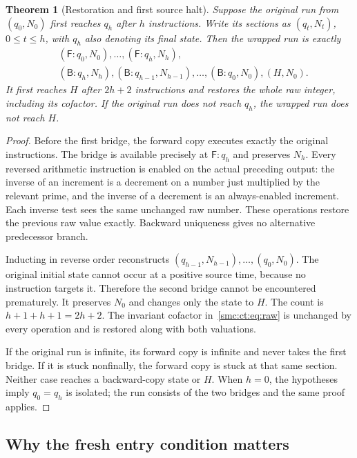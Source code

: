 \documentclass[11pt,letterpaper]{article}
\numberwithin{equation}{section}
\newtheorem{theorem}{Theorem}[section]
\theoremstyle{definition}
\theoremstyle{remark}
\newcommand{\Fq}[1]{\mathsf F\!:#1}\newcommand{\Bq}[1]{\mathsf B\!:#1}
\begin{document}
\begin{theorem}[Restoration and first source halt]\label{smc:ct:thm:restore}
Suppose the original run from $(q_0,N_0)$ first reaches $q_h$ after $h$ instructions. Write its sections as $(q_t,N_t)$, $0\le t\le h$, with $q_h$ also denoting its final state. Then the wrapped run is exactly
\begin{align*}
&(\Fq {q_0},N_0),\ldots,(\Fq {q_h},N_h),\\
&(\Bq {q_h},N_h),(\Bq {q_{h-1}},N_{h-1}),\ldots,(\Bq {q_0},N_0),(H,N_0).
\end{align*}
It first reaches $H$ after $2h+2$ instructions and restores the whole raw integer, including its cofactor. If the original run does not reach $q_h$, the wrapped run does not reach $H$.
\end{theorem}
\begin{proof}
Before the first bridge, the forward copy executes exactly the original instructions. The bridge is available precisely at $\Fq {q_h}$ and preserves $N_h$. Every reversed arithmetic instruction is enabled on the actual preceding output: the inverse of an increment is a decrement on a number just multiplied by the relevant prime, and the inverse of a decrement is an always-enabled increment. Each inverse test sees the same unchanged raw number. These operations restore the previous raw value exactly. Backward uniqueness gives no alternative predecessor branch.

Inducting in reverse order reconstructs $(q_{h-1},N_{h-1}),\ldots,(q_0,N_0)$. The original initial state cannot occur at a positive source time, because no instruction targets it. Therefore the second bridge cannot be encountered prematurely. It preserves $N_0$ and changes only the state to $H$. The count is $h+1+h+1=2h+2$. The invariant cofactor in~\eqref{smc:ct:eq:raw} is unchanged by every operation and is restored along with both valuations.

If the original run is infinite, its forward copy is infinite and never takes the first bridge. If it is stuck nonfinally, the forward copy is stuck at that same section. Neither case reaches a backward-copy state or $H$. When $h=0$, the hypotheses imply $q_0=q_h$ is isolated; the run consists of the two bridges and the same proof applies.
\end{proof}

\subsection{Why the fresh entry condition matters}\label{smc:ct:sec:fresh}
\end{document}
